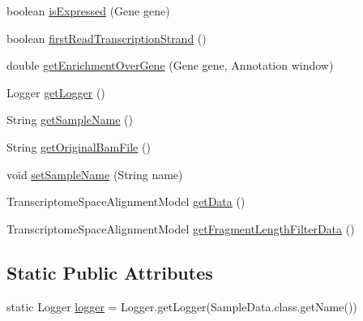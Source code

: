 \begin{DoxyCompactItemize}
$$\item 
boolean \hyperlink{classbroad_1_1pda_1_1seq_1_1clip_1_1_sample_data_a20bd1f5c944414c4305844a15c35f8a1}{is\+Expressed} (Gene gene)
\item 
boolean \hyperlink{classbroad_1_1pda_1_1seq_1_1clip_1_1_sample_data_a8bd77375c425d2175f5e63a85120b244}{first\+Read\+Transcription\+Strand} ()
\item 
double \hyperlink{classbroad_1_1pda_1_1seq_1_1clip_1_1_sample_data_a83006fe4a56566ac14690adc205bf797}{get\+Enrichment\+Over\+Gene} (Gene gene, Annotation window)
\item 
Logger \hyperlink{classbroad_1_1pda_1_1seq_1_1clip_1_1_sample_data_a2bfa33d3f02ba003618ad347cde46eda}{get\+Logger} ()
\item 
String \hyperlink{classbroad_1_1pda_1_1seq_1_1clip_1_1_sample_data_a23c6423a51684f6f61cb445eec5d98d6}{get\+Sample\+Name} ()
\item 
String \hyperlink{classbroad_1_1pda_1_1seq_1_1clip_1_1_sample_data_ac929b442873bd023a32feb28dac3dbe9}{get\+Original\+Bam\+File} ()
\item 
void \hyperlink{classbroad_1_1pda_1_1seq_1_1clip_1_1_sample_data_a2e2bdce82785743a6814f003b3dc1df0}{set\+Sample\+Name} (String name)
\item 
Transcriptome\+Space\+Alignment\+Model \hyperlink{classbroad_1_1pda_1_1seq_1_1clip_1_1_sample_data_aa5acde7843960f0190b3a1ff9ae4b708}{get\+Data} ()
\item 
Transcriptome\+Space\+Alignment\+Model \hyperlink{classbroad_1_1pda_1_1seq_1_1clip_1_1_sample_data_a36db29585dcedfafcb7169a660bef489}{get\+Fragment\+Length\+Filter\+Data} ()
\end{DoxyCompactItemize}
\subsection*{Static Public Attributes}
\begin{DoxyCompactItemize}
\item 
static Logger \hyperlink{classbroad_1_1pda_1_1seq_1_1clip_1_1_sample_data_af64488a77382d0f1f7bde4c6909de2d5}{logger} = Logger.\+get\+Logger(Sample\+Data.\+class.\+get\+Name())
\end{DoxyCompactItemize}

